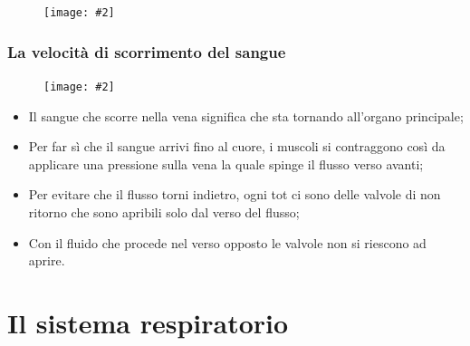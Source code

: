 \documentclass{article}
\newcommand{\cfig}[2]{
    \phantom{}
    \begin{figure}[ht!]
        \begin{center}
            \texttt{[image: \#2]}
        \end{center}
    \end{figure}
}
\begin{document}
\cfig{.9}{media/sfigmomanometro.png}

\newpage
\subsubsection{La velocità di scorrimento del sangue}

\cfig{1}{media/velocita-sangue.png}

\begin{itemize}
    \item Il sangue che scorre nella vena significa che sta tornando all’organo principale;
    \item Per far sì che il sangue arrivi fino al cuore, i muscoli si contraggono così da
        applicare una pressione sulla vena la quale spinge il flusso verso avanti;
    \item Per evitare che il flusso torni indietro, ogni tot ci sono delle valvole di non
        ritorno che sono apribili solo dal verso del flusso;
    \item Con il fluido che procede nel verso opposto le valvole non si riescono ad aprire.
\end{itemize}

\newpage
\section{Il sistema respiratorio}
\end{document}
